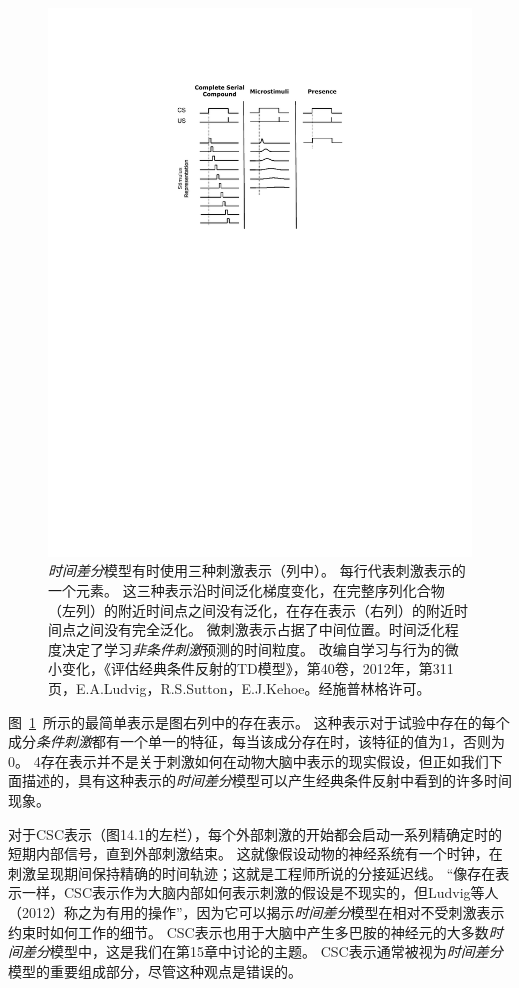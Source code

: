 {\begin{figure}[!htb]
	\centering
	\includegraphics[width=0.5\linewidth]{chap11/fig_11_1}
	\caption{\textit{时间差分}模型有时使用三种刺激表示（列中）。
		每行代表刺激表示的一个元素。
		这三种表示沿时间泛化梯度变化，在完整序列化合物（左列）的附近时间点之间没有泛化，在存在表示（右列）的附近时间点之间没有完全泛化。
		微刺激表示占据了中间位置。时间泛化程度决定了学习\textit{非条件刺激}预测的时间粒度。
		改编自学习与行为的微小变化，《评估经典条件反射的TD模型》，第40卷，2012年，第311页，E.A.Ludvig，R.S.Sutton，E.J.Kehoe。经施普林格许可。  \label{fig:11_1}}
\end{figure}

图~\ref{fig:11_1}~所示的最简单表示是图右列中的存在表示。
这种表示对于试验中存在的每个成分\textit{条件刺激}都有一个单一的特征，每当该成分存在时，该特征的值为1，否则为0。
4存在表示并不是关于刺激如何在动物大脑中表示的现实假设，但正如我们下面描述的，具有这种表示的\textit{时间差分}模型可以产生经典条件反射中看到的许多时间现象。


对于CSC表示（图14.1的左栏），每个外部刺激的开始都会启动一系列精确定时的短期内部信号，直到外部刺激结束。
这就像假设动物的神经系统有一个时钟，在刺激呈现期间保持精确的时间轨迹；这就是工程师所说的分接延迟线。
“像存在表示一样，CSC表示作为大脑内部如何表示刺激的假设是不现实的，但Ludvig等人（2012）称之为有用的操作”，因为它可以揭示\textit{时间差分}模型在相对不受刺激表示约束时如何工作的细节。
CSC表示也用于大脑中产生多巴胺的神经元的大多数\textit{时间差分}模型中，这是我们在第15章中讨论的主题。
CSC表示通常被视为\textit{时间差分}模型的重要组成部分，尽管这种观点是错误的。


}
